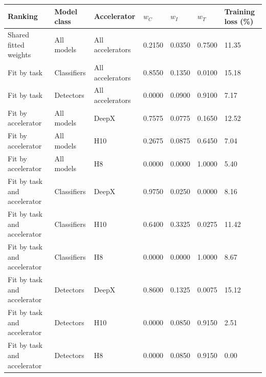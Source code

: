\begin{tabular}{@{}lllllll@{}}
\toprule
Ranking & Model class & Accelerator & $w_C$ & $w_I$ & $w_T$ & Training loss (\%) \\
\midrule
Shared fitted weights & All models & All accelerators & 0.2150 & 0.0350 & 0.7500 & 11.35 \\
Fit by task & Classifiers & All accelerators & 0.8550 & 0.1350 & 0.0100 & 15.18 \\
Fit by task & Detectors & All accelerators & 0.0000 & 0.0900 & 0.9100 & 7.17 \\
Fit by accelerator & All models & DeepX & 0.7575 & 0.0775 & 0.1650 & 12.52 \\
Fit by accelerator & All models & H10 & 0.2675 & 0.0875 & 0.6450 & 7.04 \\
Fit by accelerator & All models & H8 & 0.0000 & 0.0000 & 1.0000 & 5.40 \\
Fit by task and accelerator & Classifiers & DeepX & 0.9750 & 0.0250 & 0.0000 & 8.16 \\
Fit by task and accelerator & Classifiers & H10 & 0.6400 & 0.3325 & 0.0275 & 11.42 \\
Fit by task and accelerator & Classifiers & H8 & 0.0000 & 0.0000 & 1.0000 & 8.67 \\
Fit by task and accelerator & Detectors & DeepX & 0.8600 & 0.1325 & 0.0075 & 15.12 \\
Fit by task and accelerator & Detectors & H10 & 0.0000 & 0.0850 & 0.9150 & 2.51 \\
Fit by task and accelerator & Detectors & H8 & 0.0000 & 0.0850 & 0.9150 & 0.00 \\
\bottomrule
\end{tabular}
